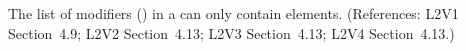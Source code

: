 The list of modifiers () in a \Reaction can only
contain  elements.  (References: L2V1
Section~4.9; L2V2 Section~4.13; L2V3 Section~4.13; L2V4 Section~4.13.)
